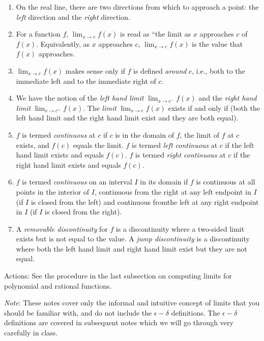 \documentclass[10pt]{amsart}
\begin{document}
\begin{enumerate}

\item On the real line, there are two directions from which to
  approach a point: the {\em left} direction and the {\em right}
  direction.
\item For a function $f$, $\lim_{x \to c} f(x)$ is read as ``the limit
  as $x$ approaches $c$ of $f(x)$. Equivalently, as $x$ approaches
  $c$, $\lim_{x \to c} f(x)$ is the value that $f(x)$ approaches.
\item $\lim_{x \to c} f(x)$ makes sense only if $f$ is defined {\em
  around} $c$, i.e., both to the immediate left and to the immediate
  right of $c$.
\item We have the notion of the {\em left hand limit} $\lim_{x \to
  c^-} f(x)$ and the {\em right hand limit} $\lim_{x \to c^+}
  f(x)$. The {\em limit} $\lim_{x \to c} f(x)$ exists if and only if
  (both the left hand limit and the right hand limit exist and they are
  both equal).
\item $f$ is termed {\em continuous} at $c$ if $c$ is in the domain of
  $f$, the limit of $f$ at $c$ exists, and $f(c)$ equals the
  limit. $f$ is termed {\em left continuous} at $c$ if the left hand
  limit exists and equals $f(c)$. $f$ is termed {\em right continuous}
  at $c$ if the right hand limit exists and equals $f(c)$.
\item $f$ is termed {\em continuous} on an interval $I$ in its domain
  if $f$ is continuous at all points in the interior of $I$,
  continuous from the right at any left endpoint in $I$ (if $I$ is
  closed from the left) and continuous fromthe left at any right
  endpoint in $I$ (if $I$ is closed from the right).
\item A {\em removable discontinuity} for $f$ is a discontinuity where
  a two-sided limit exists but is not equal to the value. A {\em jump
  discontinuity} is a discontinuity where both the left hand limit and
  right hand limit exist but they are not equal.
\end{enumerate}

Actions: See the procedure in the last subsection on computing limits
for polynomial and rational functions.

{\em Note}: These notes cover only the informal and intuitive concept
of limits that you should be familiar with, and do not include the
$\epsilon-\delta$ definitions. The $\epsilon-\delta$ definitions are
covered in subsequent notes which we will go through very carefully in
class.
\end{document}
